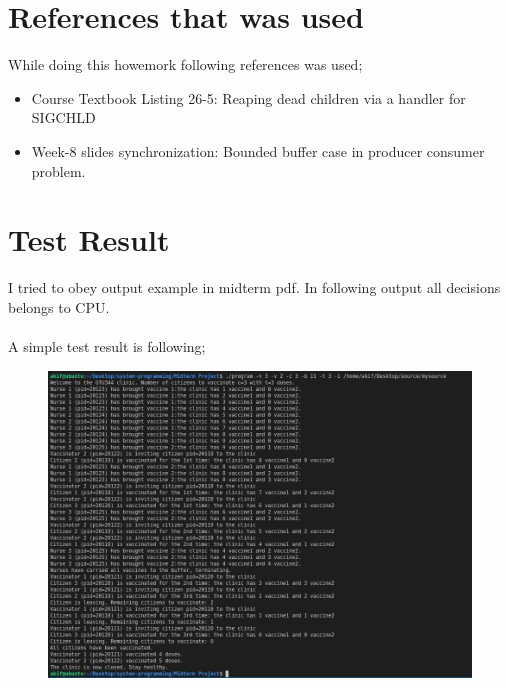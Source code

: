 \documentclass{article}
\begin{document}
\section{References that was used} 
While doing this howemork following references was used;
\begin{itemize}
	\item Course Textbook Listing 26-5: Reaping dead children via a handler for SIGCHLD
	\item Week-8 slides synchronization: Bounded buffer case in producer consumer problem.
\end{itemize}
\cleardoublepage
\section{Test Result}
I tried to obey output example in midterm pdf. In following output all decisions belongs to CPU. \\ \\
A simple test result is following;
\begin{figure}[H]
\includegraphics[width=1\textwidth, left]{result.JPG}
\caption[Optional caption]{}
\label{}
		
\end{figure}                              
\end{document}
